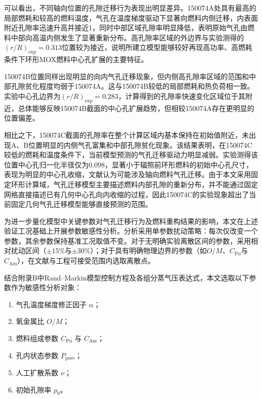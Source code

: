 可以看出，不同轴向位置的孔隙迁移行为表现出明显差异。150074A处具有最高的局部燃耗和较高的燃料温度，气孔在温度梯度驱动下显著向燃料内侧迁移，内表面附近孔隙率迅速升高并接近1，同时中部区域孔隙率明显降低，表明原始气孔由燃料中部向高温内侧发生了显著重新分布。高孔隙率区域的外边界与实验测得的$(r/R)_{\mathrm{exp}}=0.313$位置较为接近，说明所建立模型能够较好再现高功率、高燃耗条件下环形MOX燃料中心孔扩展的主要特征。

150074B位置同样出现明显的向内气孔迁移现象，但内侧高孔隙率区域的范围和中部孔隙贫化程度均弱于150074A。这与150074B较低的局部燃耗和热负荷相一致。实验中心孔边界为$(r/R)_{\mathrm{exp}}=0.283$，计算得到的孔隙率快速变化区域位于其附近，总体能够反映150074B截面的中心孔扩展趋势，但相较150074A存在更明显的位置偏差。

相比之下，150074C截面的孔隙率在整个计算区域内基本保持在初始值附近，未出现A、B位置明显的内侧气孔富集和中部孔隙贫化现象。该结果表明，在150074C较低的燃耗和温度条件下，当前模型预测的气孔迁移驱动力明显减弱。实验测得该位置中心孔归一化半径仅为0.098，显著小于辐照前环形燃料的初始中心孔尺寸，表现为明显的中心孔收缩，文献\cite{teagueMicrostructuralCharacterizationHigh2013}认为可能涉及轴向燃料气孔迁移。由于本文采用固定环形计算域，气孔迁移模型主要描述燃料内部孔隙的重新分布，并不能通过固定网格直接描述已有几何中心孔向内收缩的过程，因此150074C的实验现象超出了当前固定几何气孔迁移模型能够直接预测的范围。

\label{sec:sensitivity_analysis}
为进一步量化模型中关键参数对气孔迁移行为及燃料重构结果的影响，本文在上述验证工况基础上开展参数敏感性分析。分析采用单参数扰动策略：每次仅改变一个参数，其余参数保持基准工况取值不变。对于无明确实验离散区间的参数，采用相对扰动区间（$\pm15\%$与$\pm30\%$）；对于具有明确物理边界的参数（如$O/M$、$C_{\mathrm{Pu}}$与$C_{\mathrm{Am}}$），在文献与工程可接受范围内选取离散点。

结合附录B中Rand--Markin模型控制方程及各组分蒸气压表达式，本文选取以下参数作为敏感性分析对象：
\begin{enumerate}
	\item 气孔温度梯度修正因子 $\alpha$；
	\item 氧金属比 $O/M$；
	\item 燃料组成参数 $C_{\mathrm{Pu}}$ 与 $C_{\mathrm{Am}}$；
	\item 孔内状态参数 $P_{\mathrm{pore}}$；
	\item 人工扩散系数 $\nu$；
	\item 初始孔隙率 $p_0$。
\end{enumerate}

